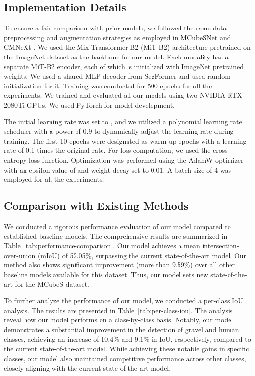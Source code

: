 \documentclass{article}
\begin{document}
\subsection{Implementation Details}

To ensure a fair comparison with prior models, we followed the same data preprocessing and augmentation strategies as employed in MCubeSNet \cite{Liang2022MCubeS} and CMNeXt \cite{zhang2023CMNext}. We used the Mix-Transformer-B2 (MiT-B2) \cite{xie2021segformer} architecture pretrained on the ImageNet \cite{deng2009ImageNet} dataset as the backbone for our model. Each modality has a separate MiT-B2 \cite{xie2021segformer} encoder, each of which is initialized with ImageNet \cite{deng2009ImageNet} pretrained weights. We used a shared MLP decoder from SegFormer \cite{xie2021segformer} and used random initialization for it. Training was conducted for 500 epochs for all the experiments. We trained and evaluated all our models using two NVIDIA RTX 2080Ti GPUs. We used PyTorch for model development. 

The initial learning rate was set to , and we utilized a polynomial learning rate scheduler with a power of 0.9 to dynamically adjust the learning rate during training. The first 10 epochs were designated as warm-up epochs with a learning rate of 0.1 times the original rate. For loss computation, we used the cross-entropy loss function. Optimization was performed using the AdamW \cite{loshchilov2017adamw} optimizer with an epsilon value of  and weight decay set to 0.01. A batch size of 4 was employed for all the experiments. 


\subsection{Comparison with Existing Methods}
We conducted a rigorous performance evaluation of our model compared to established baseline models. The comprehensive results are summarized in Table~\ref{tab:performance-comparison}. Our model achieves a mean intersection-over-union (mIoU) of 52.05\%, surpassing the current state-of-the-art model. Our method also shows significant improvement (more than 9.59\%) over all other baseline models available for this dataset. Thus, our model sets new state-of-the-art for the MCubeS dataset.

To further analyze the performance of our model, we conducted a per-class IoU analysis. The results are presented in Table~\ref{tab:per-class-iou}. The analysis reveal how our model performs on a class-by-class basis. Notably, our model demonstrates a substantial improvement in the detection of gravel and human classes, achieving an increase of 10.4\% and 9.1\% in IoU, respectively, compared to the current state-of-the-art model. While achieving these notable gains in specific classes, our model also maintained competitive performance across other classes, closely aligning with the current state-of-the-art model. 
\end{document}
